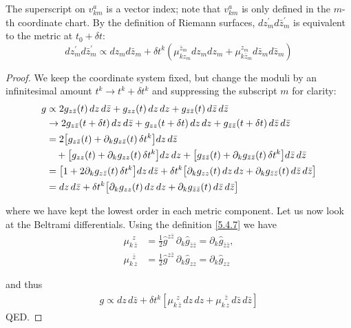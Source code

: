 The superscript on $v_{k m}^{a}$ is a vector index; note that $v_{k m}^{a}$ is only defined in the $m$-th coordinate chart. By the definition of Riemann surfaces, $d z_{m}^{\prime} d \bar{z}_{m}^{\prime}$ is equivalent to the metric at $t_{0}+\delta t$:
\begin{equation}
	d z_{m}^{\prime} d \bar{z}_{m}^{\prime} \propto d z_{m} d \bar{z}_{m}+\delta t^{k}\left(\mu_{k z_{m}}^{\bar{z}_{m}} d z_{m} d z_{m}+\mu_{k \bar{z}_{m}}^{z_{m}} d \bar{z}_{m} d \bar{z}_{m}\right)\label{5.4.10}
\end{equation}
\begin{tcolorbox}[breakable]
	\begin{proof}
		We keep the coordinate system fixed, but change the moduli by an infinitesimal amount $t^k\to t^k+\delta t^k$ and suppressing the subscript $m$ for clarity:
		\begin{align}
			g &\propto 2g_{z\bar z}(t)\,dz\,d\bar z + g_{zz}(t)\,dz\,dz + g_{\bar z\bar z}(t)\,d\bar z\,d\bar z \nonumber\\
			&\to 2g_{z\bar z}(t+\delta t)\,dz\,d\bar z + g_{zz}(t+\delta t)\,dz\,dz + g_{\bar z\bar z}(t+\delta t)\,d\bar z\,d\bar z \nonumber\\
			&= 2\big[g_{z\bar z}(t) + \partial_k g_{z\bar z}(t)\,\delta t^k\big] dz\,d\bar z \notag \\
			&\quad + \big[g_{zz}(t) + \partial_k g_{zz}(t)\,\delta t^k\big] dz\,dz
			+ \big[g_{\bar z\bar z}(t) + \partial_k g_{\bar z\bar z}(t)\,\delta t^k\big] d\bar z\,d\bar z\nonumber \\
			&= \big[1 + 2\partial_k g_{z\bar z}(t)\,\delta t^k\big] dz\,d\bar z 
			+ \delta t^k \big[\partial_k g_{zz}(t)\,dz\,dz + \partial_k g_{\bar z\bar z}(t)\,d\bar z\,d\bar z\big] \nonumber\\
			&= dz\,d\bar z + \delta t^k \big[\partial_k g_{zz}(t)\,dz\,dz + \partial_k g_{\bar z\bar z}(t)\,d\bar z\,d\bar z\big]\label{5.105}
		\end{align}
		
		where we have kept the lowest order in each metric component. Let us now look at the Beltrami differentials. Using the definition \eqref{5.4.7} we have
		\begin{align}
			\mu_{k\,\bar z}^{\ \ z} &= \frac{1}{2}\hat g^{z\bar z}\,\partial_k \hat g_{\bar z\bar z}
			= \partial_k \hat g_{\bar z\bar z}, \nonumber\\
			\mu_{k\,z}^{\ \ \bar z} &= \frac{1}{2}\hat g^{z\bar z}\,\partial_k \hat g_{zz}
			= \partial_k \hat g_{zz}
		\end{align}
		
		and thus
		\begin{align}
			g \propto dz\,d\bar z + \delta t^k \left[
			\mu_{k\,\bar z}^{\ \ z}\,dz\,dz
			+ \mu_{k\,z}^{\ \ \bar z}\,d\bar z\,d\bar z
			\right]
		\end{align}
		QED.
	\end{proof}
\end{tcolorbox}
